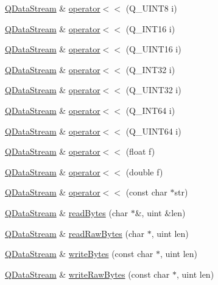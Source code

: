 \begin{DoxyCompactItemize}
\item 
\mbox{\hyperlink{class_q_data_stream}{Q\+Data\+Stream}} \& \mbox{\hyperlink{class_q_data_stream_a27489574dd585cc4135a62a79ffddd31}{operator$<$$<$}} (Q\+\_\+\+U\+I\+N\+T8 i)
\item 
\mbox{\hyperlink{class_q_data_stream}{Q\+Data\+Stream}} \& \mbox{\hyperlink{class_q_data_stream_a3e9c6b46679fd2c4f329f583bf71ae54}{operator$<$$<$}} (Q\+\_\+\+I\+N\+T16 i)
\item 
\mbox{\hyperlink{class_q_data_stream}{Q\+Data\+Stream}} \& \mbox{\hyperlink{class_q_data_stream_a4a3c9a1b9992a8ce634ce0f31abe2e46}{operator$<$$<$}} (Q\+\_\+\+U\+I\+N\+T16 i)
\item 
\mbox{\hyperlink{class_q_data_stream}{Q\+Data\+Stream}} \& \mbox{\hyperlink{class_q_data_stream_af393e47c4b68b6d23a626b563b1285ca}{operator$<$$<$}} (Q\+\_\+\+I\+N\+T32 i)
\item 
\mbox{\hyperlink{class_q_data_stream}{Q\+Data\+Stream}} \& \mbox{\hyperlink{class_q_data_stream_a87eeac568a1c8662b2cc22d1377a91e9}{operator$<$$<$}} (Q\+\_\+\+U\+I\+N\+T32 i)
\item 
\mbox{\hyperlink{class_q_data_stream}{Q\+Data\+Stream}} \& \mbox{\hyperlink{class_q_data_stream_afe1363161b0226397b87d6e878895339}{operator$<$$<$}} (Q\+\_\+\+I\+N\+T64 i)
\item 
\mbox{\hyperlink{class_q_data_stream}{Q\+Data\+Stream}} \& \mbox{\hyperlink{class_q_data_stream_a096e99ad349228cd45a2bbb4256663e5}{operator$<$$<$}} (Q\+\_\+\+U\+I\+N\+T64 i)
\item 
\mbox{\hyperlink{class_q_data_stream}{Q\+Data\+Stream}} \& \mbox{\hyperlink{class_q_data_stream_ac4e26950daf4c0f894d6b3e709b7ec58}{operator$<$$<$}} (float f)
\item 
\mbox{\hyperlink{class_q_data_stream}{Q\+Data\+Stream}} \& \mbox{\hyperlink{class_q_data_stream_a61587be69fdaa840c4d42eb592c79af2}{operator$<$$<$}} (double f)
\item 
\mbox{\hyperlink{class_q_data_stream}{Q\+Data\+Stream}} \& \mbox{\hyperlink{class_q_data_stream_acf97e65484056bc6b3fb150c4f339344}{operator$<$$<$}} (const char $\ast$str)
\item 
\mbox{\hyperlink{class_q_data_stream}{Q\+Data\+Stream}} \& \mbox{\hyperlink{class_q_data_stream_a296311b844103880ec50b43a2ebbfcaa}{read\+Bytes}} (char $\ast$\&, uint \&len)
\item 
\mbox{\hyperlink{class_q_data_stream}{Q\+Data\+Stream}} \& \mbox{\hyperlink{class_q_data_stream_a04938bc54d1158276cf01be169d159ea}{read\+Raw\+Bytes}} (char $\ast$, uint len)
\item 
\mbox{\hyperlink{class_q_data_stream}{Q\+Data\+Stream}} \& \mbox{\hyperlink{class_q_data_stream_a8f1af77d483ecfd515c9eac3822aaaa5}{write\+Bytes}} (const char $\ast$, uint len)
\item 
\mbox{\hyperlink{class_q_data_stream}{Q\+Data\+Stream}} \& \mbox{\hyperlink{class_q_data_stream_aab2b83b4d7407ed57ff9eea136cb2e5e}{write\+Raw\+Bytes}} (const char $\ast$, uint len)
\end{DoxyCompactItemize}


